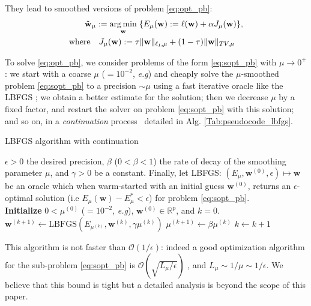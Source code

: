 They lead to smoothed versions of problem \eqref{eq:opt_pb}:
\begin{align}
  \mathbf{\hat{w}}_{\mu} := \operatorname*{arg\,min}_{\mathbf{w}}\;
  \{E_{\mu}(\mathbf{w}) := \ell(\mathbf{w}) + \alpha
    J_{\mu}(\mathbf{w})\},
  \label{eq:sopt_pb}
\\
    \text{where} \quad
    J_{\mu}(\mathbf{w}) :=\tau \|\mathbf{w}\|_{\ell_{1},\mu} +
    (1 - \tau)\|\mathbf{w}\|_{TV, \mu} \quad
\end{align}

To solve \eqref{eq:opt_pb}, we consider problems of the form
\eqref{eq:sopt_pb} with $\mu \rightarrow 0^+$: we start with a coarse
$\mu$ ($= 10^{-2}$, \emph{e.g}) and cheaply solve the $\mu$-smoothed problem
\eqref{eq:sopt_pb} to a precision $\sim \mu$ using a fast
iterative oracle like the LBFGS \cite{ciyou1994}; we
obtain a better estimate for the solution; then we decrease $\mu$ by a fixed factor,
and restart the solver on problem \eqref{eq:sopt_pb} with this solution; and so on, in a 
\emph{continuation} process~\cite{NESTA} detailed in Alg.
\ref{Tab:pseudocode_lbfgs}.

\begin{algorithm}
  \caption{LBFGS algorithm with continuation}
  \label{Tab:pseudocode_lbfgs}  
  \begin{algorithmic}[1]  
    \Require $\epsilon > 0$ the desired precision, $\beta$ ($0 < \beta <
    1$) the rate of decay of the smoothing parameter $\mu$, and $\gamma > 0$ be a constant.
    Finally,
    let LBFGS: $(E_\mu, \mathbf{w}^{(0)}, \epsilon) \mapsto \mathbf{w}$ be
    an oracle which when warm-started with an initial guess
    $\mathbf{w}^{(0)}$, returns an $\epsilon$-optimal
    solution (i.e $E_\mu(\mathbf{w}) - E_\mu^{*} < \epsilon$) for problem \eqref{eq:sopt_pb}.\\
    \textbf{Initialize} $ 0 < \mu^{(0)}$ ($= 10^{-2}$, \emph{e.g}),
    $\mathbf{w}^{(0)}\in \mathbb{R}^p$, and $k = 0$.
    \State $\mathbf{w}^{(k + 1)} \leftarrow \mbox{LBFGS}(E_{\mu^{(k)}}, \mathbf{w}^{(k)}, \gamma\mu^{(k)})$
    \State $\mu^{(k + 1)} \leftarrow \beta \mu^{(k)}$
    \State $k \leftarrow k + 1$
    \EndWhile
  \end{algorithmic}
\end{algorithm}

This algorithm is not faster than
$\mathcal{O}(1/\epsilon)$: indeed a good optimization algorithm
for the sub-problem \eqref{eq:sopt_pb} is $\mathcal{O}(\sqrt{L_{\mu}/\epsilon})$
\cite{nesterov1983}, and $L_{\mu} \sim 1 / \mu \sim 1 / \epsilon$. We
believe that this bound is tight but a detailed analysis is
beyond the scope of this paper.

